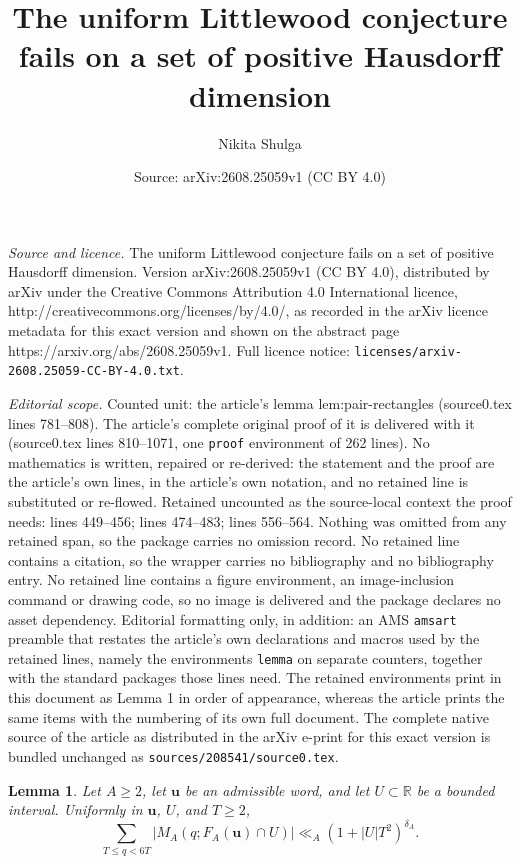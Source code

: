 \documentclass[10pt,a4paper]{amsart}
\title{The uniform Littlewood conjecture fails on a set of positive Hausdorff dimension}
\author{Nikita Shulga}
\date{Source: arXiv:2608.25059v1 (CC BY 4.0)}
\newtheorem{lemma}{Lemma}
\newcommand{\R}{\mathbb R}
\begin{document}
\maketitle

\noindent\emph{Source and licence.} The uniform Littlewood conjecture fails on a set of positive Hausdorff dimension. Version arXiv:2608.25059v1 (CC BY 4.0), distributed by arXiv under the Creative Commons Attribution 4.0 International licence, http://creativecommons.org/licenses/by/4.0/, as recorded in the arXiv licence metadata for this exact version and shown on the abstract page https://arxiv.org/abs/2608.25059v1. Full licence notice: \texttt{licenses/arxiv-2608.25059-CC-BY-4.0.txt}.\par\smallskip

\noindent\textit{Editorial scope.} Counted unit: the article's lemma lem:pair-rectangles (source0.tex lines 781--808). The article's complete original proof of it is delivered with it (source0.tex lines 810--1071, one \texttt{proof} environment of 262 lines). No mathematics is written, repaired or re-derived: the statement and the proof are the article's own lines, in the article's own notation, and no retained line is substituted or re-flowed.  Retained uncounted as the source-local context the proof needs: lines 449--456; lines 474--483; lines 556--564.  Nothing was omitted from any retained span, so the package carries no omission record.  No retained line contains a citation, so the wrapper carries no bibliography and no bibliography entry.  No retained line contains a figure environment, an image-inclusion command or drawing code, so no image is delivered and the package declares no asset dependency.  Editorial formatting only, in addition: an AMS \texttt{amsart} preamble that restates the article's own declarations and macros used by the retained lines, namely the environments \texttt{lemma} on separate counters, together with the standard packages those lines need.  The retained environments print in this document as Lemma 1 in order of appearance, whereas the article prints the same items with the numbering of its own full document.  The complete native source of the article as distributed in the arXiv e-print for this exact version is bundled unchanged as \texttt{sources/208541/source0.tex}.
\begin{lemma}\label{lem:local-rational-upper}
Let $A\ge2$, let $\mathbf{u}$ be an admissible word, and let $U\subset\R$ be a bounded
interval.  Uniformly in $\mathbf{u}$, $U$, and $T\ge2$,
\begin{equation}\label{eq:hensley-local-upper}
 \sum_{T\le q<6T}|M_A(q;F_A(\mathbf{u})\cap U)|
 \ll_A (1+|U|T^2)^{\delta_A}.
\end{equation}
\end{lemma}
\end{document}
